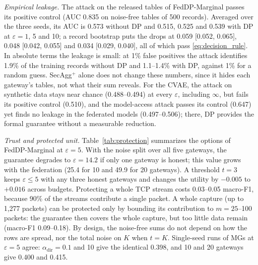 \textit{Empirical leakage.} The attack on the released tables of FedDP-Marginal passes its positive control (AUC 0.835 on noise-free tables of 500 records). Averaged over the three seeds, its AUC is 0.573 without DP and 0.515, 0.525 and 0.539 with DP at $\varepsilon = 1$, 5 and 10; a record bootstrap puts the drops at 0.059 [0.052, 0.065], 0.048 [0.042, 0.055] and 0.034 [0.029, 0.040], all of which pass \eqref{eq:decision_rule}. In absolute terms the leakage is small: at 1\% false positives the attack identifies 1.9\% of the training records without DP and 1.1--1.4\% with DP, against 1\% for a random guess. SecAgg$^+$ alone does not change these numbers, since it hides each gateway's tables, not what their sum reveals. For the CVAE, the attack on synthetic data stays near chance (0.488--0.494) at every $\varepsilon$, including $\infty$, but fails its positive control (0.510), and the model-access attack passes its control (0.647) yet finds no leakage in the federated models (0.497--0.506); there, DP provides the formal guarantee without a measurable reduction.

\textit{Trust and protected unit.} Table~\ref{tab:protection} summarizes the options of FedDP-Marginal at $\varepsilon = 5$. With the noise split over all five gateways, the guarantee degrades to $\varepsilon = 14.2$ if only one gateway is honest; this value grows with the federation (25.4 for 10 and 49.9 for 20 gateways). A threshold $t = 3$ keeps $\varepsilon \le 5$ with any three honest gateways and changes the utility by $-0.005$ to $+0.016$ across budgets. Protecting a whole TCP stream costs 0.03--0.05 macro-F1, because 90\% of the streams contribute a single packet. A whole capture (up to 1,277 packets) can be protected only by bounding its contribution to $m = 25$--100 packets: the guarantee then covers the whole capture, but too little data remain (macro-F1 0.09--0.18). By design, the noise-free sums do not depend on how the rows are spread, nor the total noise on $K$ when $t = K$. Single-seed runs of MGs at $\varepsilon = 5$ agree: $\alpha_{\mathrm{dir}} = 0.1$ and 10 give the identical 0.398, and 10 and 20 gateways give 0.400 and 0.415.

